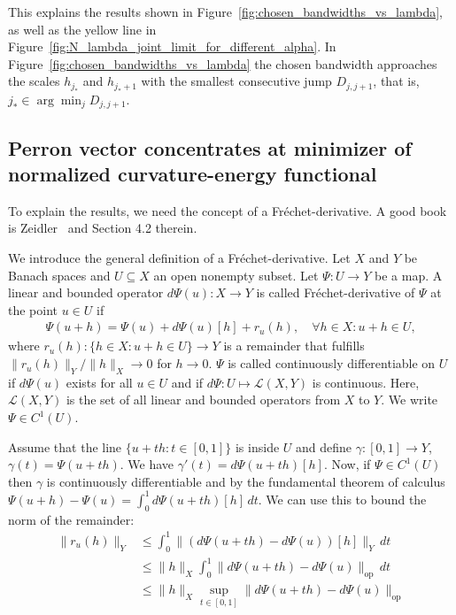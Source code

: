This explains the results shown in Figure~\ref{fig:chosen_bandwidths_vs_lambda}, as well as the yellow line in Figure~\ref{fig:N_lambda_joint_limit_for_different_alpha}. In Figure~\ref{fig:chosen_bandwidths_vs_lambda} the chosen bandwidth approaches the scales $h_{j_{\ast}}$ and $h_{j_{\ast}+1}$ with the smallest consecutive jump $D_{j,j+1}$, that is, $j_{\ast}\in\arg\min_jD_{j,j+1}$.



\subsection{Perron vector concentrates at minimizer of normalized curvature-energy functional}

To explain the results, we need the concept of a Fréchet-derivative. A good book is Zeidler~\cite{zeidler_applied_1995} and Section 4.2 therein.

We introduce the general definition of a Fréchet-derivative. Let $X$ and $Y$ be Banach spaces and $U\subseteq X$ an open nonempty subset. Let $\Psi:U\to Y$ be a map. A linear and bounded operator $d\Psi(u):X\to Y$ is called Fréchet-derivative of $\Psi$ at the point $u\in U$ if
\begin{align*}
    \Psi(u+h)=\Psi(u)+d\Psi(u)[h]+r_u(h),\quad\forall h\in X:u+h\in U,
\end{align*}
where $r_u(h):\{h\in X:u+h\in U\}\to Y$ is a remainder that fulfills $\|r_u(h)\|_Y/\|h\|_X\to0$ for $h\to0$. $\Psi$ is called continuously differentiable on $U$ if $d\Psi(u)$ exists for all $u\in U$ and if $d\Psi:U\mapsto\mathcal{L}(X,Y)$ is continuous. Here, $\mathcal{L}(X,Y)$ is the set of all linear and bounded operators from $X$ to $Y$. We write $\Psi\in C^1(U)$.

Assume that the line $\{u+th:t\in[0,1]\}$ is inside $U$ and define $\gamma:[0,1]\to Y$, $\gamma(t)=\Psi(u+th)$. We have $\gamma'(t)=d\Psi(u+th)[h]$. Now, if $\Psi\in C^{1}(U)$ then $\gamma$ is continuously differentiable and by the fundamental theorem of calculus $\Psi(u+h)-\Psi(u)=\int_0^1d\Psi(u+th)[h]\,dt$. We can use this to bound the norm of the remainder:
\begin{align*}
    \|r_u(h)\|_Y&\le\int_0^1\|(d\Psi(u+th)-d\Psi(u))[h]\|_Y\,dt\\&
    \le\|h\|_X\int_0^1\|d\Psi(u+th)-d\Psi(u)\|_{\text{op}}\,dt\\&
    \le\|h\|_X\sup_{t\in[0,1]}\|d\Psi(u+th)-d\Psi(u)\|_{\text{op}}
\end{align*}

